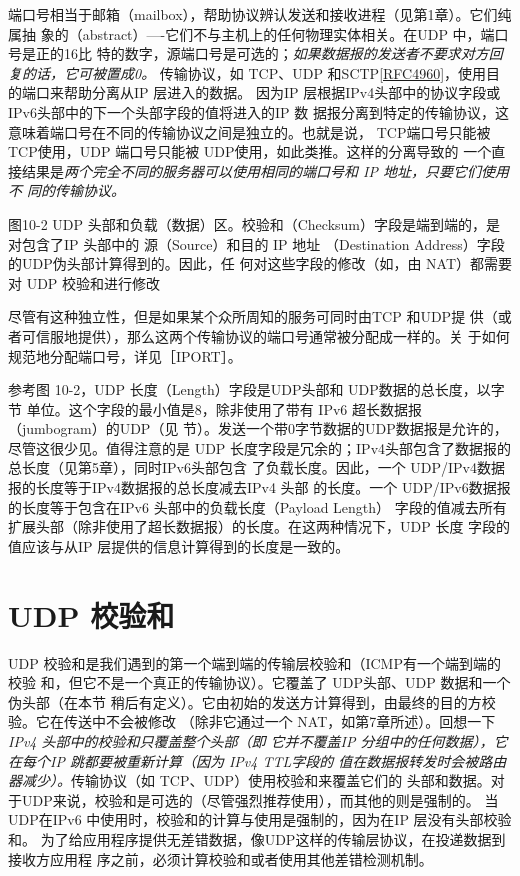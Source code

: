 端口号相当于邮箱（mailbox），帮助协议辨认发送和接收进程（见第1章）。它们纯属抽
象的（abstract）—-它们不与主机上的任何物理实体相关。在UDP 中，端口号是正的16比
特的数字，源端口号是可选的；\emph{如果数据报的发送者不要求对方回复的话，它可被置成0。}
传输协议，如 TCP、UDP
和SCTP\href{https://www.rfc-editor.org/rfc/rfc4960}{[RFC4960]}，使用目的端口来帮助分离从IP
层进入的数据。
因为IP 层根据IPv4头部中的协议字段或IPv6头部中的下一个头部字段的值将进入的IP 数
据报分离到特定的传输协议，这意味着端口号在不同的传输协议之间是独立的。也就是说，
TCP端口号只能被 TCP使用，UDP 端口号只能被 UDP使用，如此类推。这样的分离导致的
一个直接结果是\emph{两个完全不同的服务器可以使用相同的端口号和 IP 地址，只要它们使用不
同的传输协议。}

图10-2 UDP 头部和负载（数据）区。校验和（Checksum）字段是端到端的，是对包含了IP 头部中的
源（Source）和目的 IP 地址 （Destination Address）字段的UDP伪头部计算得到的。因此，任
何对这些字段的修改（如，由 NAT）都需要对 UDP 校验和进行修改

\begin{tcolorbox}
  尽管有这种独立性，但是如果某个众所周知的服务可同时由TCP 和UDP提
  供（或者可信服地提供），那么这两个传输协议的端口号通常被分配成一样的。关
  于如何规范地分配端口号，详见［IPORT］。
\end{tcolorbox}

参考图 10-2，UDP 长度（Length）字段是UDP头部和 UDP数据的总长度，以字节
单位。这个字段的最小值是8，除非使用了带有 IPv6 超长数据报（jumbogram）的UDP（见
节）。发送一个带0字节数据的UDP数据报是允许的，尽管这很少见。值得注意的是
UDP 长度字段是冗余的；IPv4头部包含了数据报的总长度（见第5章），同时IPv6头部包含
了负载长度。因此，一个 UDP/IPv4数据报的长度等于IPv4数据报的总长度减去IPv4 头部
的长度。一个 UDP/IPv6数据报的长度等于包含在IPv6 头部中的负载长度（Payload Length）
字段的值减去所有扩展头部（除非使用了超长数据报）的长度。在这两种情况下，UDP 长度
字段的值应该与从IP 层提供的信息计算得到的长度是一致的。

\section{UDP 校验和}
UDP 校验和是我们遇到的第一个端到端的传输层校验和（ICMP有一个端到端的校验
和，但它不是一个真正的传输协议）。它覆盖了 UDP头部、UDP 数据和一个伪头部（在本节
稍后有定义）。它由初始的发送方计算得到，由最终的目的方校验。它在传送中不会被修改
（除非它通过一个 NAT，如第7章所述）。回想一下\emph{ IPv4 头部中的校验和只覆盖整个头部（即
  它并不覆盖IP 分组中的任何数据），它在每个IP 跳都要被重新计算（因为 IPv4 TTL字段的
值在数据报转发时会被路由器减少）。}传输协议（如 TCP、UDP）使用校验和来覆盖它们的
头部和数据。对于UDP来说，校验和是可选的（尽管强烈推荐使用），而其他的则是强制的。
当UDP在IPv6 中使用时，校验和的计算与使用是强制的，因为在IP 层没有头部校验和。
为了给应用程序提供无差错数据，像UDP这样的传输层协议，在投递数据到接收方应用程
序之前，必须计算校验和或者使用其他差错检测机制。

